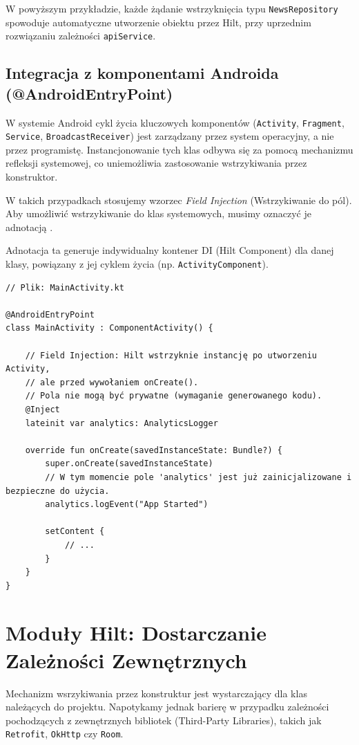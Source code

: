 W powyższym przykładzie, każde żądanie wstrzyknięcia typu \texttt{NewsRepository} spowoduje automatyczne utworzenie obiektu przez Hilt, przy uprzednim rozwiązaniu zależności \texttt{apiService}.

\subsection{Integracja z komponentami Androida (@AndroidEntryPoint)}

W systemie Android cykl życia kluczowych komponentów (\texttt{Activity}, \texttt{Fragment}, \texttt{Service}, \texttt{BroadcastReceiver}) jest zarządzany przez system operacyjny, a nie przez programistę. Instancjonowanie tych klas odbywa się za pomocą mechanizmu refleksji systemowej, co uniemożliwia zastosowanie wstrzykiwania przez konstruktor.

W takich przypadkach stosujemy wzorzec \textit{Field Injection} (Wstrzykiwanie do pól). Aby umożliwić wstrzykiwanie do klas systemowych, musimy oznaczyć je adnotacją .

Adnotacja ta generuje indywidualny kontener DI (Hilt Component) dla danej klasy, powiązany z jej cyklem życia (np. \texttt{ActivityComponent}).

\begin{verbatim}
// Plik: MainActivity.kt

@AndroidEntryPoint 
class MainActivity : ComponentActivity() {

    // Field Injection: Hilt wstrzyknie instancję po utworzeniu Activity,
    // ale przed wywołaniem onCreate().
    // Pola nie mogą być prywatne (wymaganie generowanego kodu).
    @Inject 
    lateinit var analytics: AnalyticsLogger 

    override fun onCreate(savedInstanceState: Bundle?) {
        super.onCreate(savedInstanceState)
        // W tym momencie pole 'analytics' jest już zainicjalizowane i bezpieczne do użycia.
        analytics.logEvent("App Started")
        
        setContent {
            // ...
        }
    }
}
\end{verbatim}

\section{Moduły Hilt: Dostarczanie Zależności Zewnętrznych}

Mechanizm wsrzykiwania przez konstruktur jest wystarczający dla klas należących do projektu. Napotykamy jednak barierę w przypadku zależności pochodzących z zewnętrznych bibliotek (Third-Party Libraries), takich jak \texttt{Retrofit}, \texttt{OkHttp} czy \texttt{Room}.

